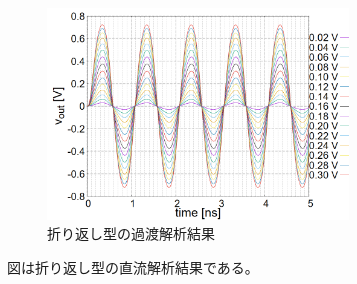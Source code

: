 \documentclass[twocolumn]{jsarticle}
\begin{document}
    \begin{figure}[H]
        \begin{center}
            \includegraphics*[width = 80mm]{figures/NtoN_tr.PNG}
            \caption{折り返し型の過渡解析結果}
            \label{fig:sim_NtoN_tr}
        \end{center}
    \end{figure}
    図は折り返し型の直流解析結果である。
\end{document}
